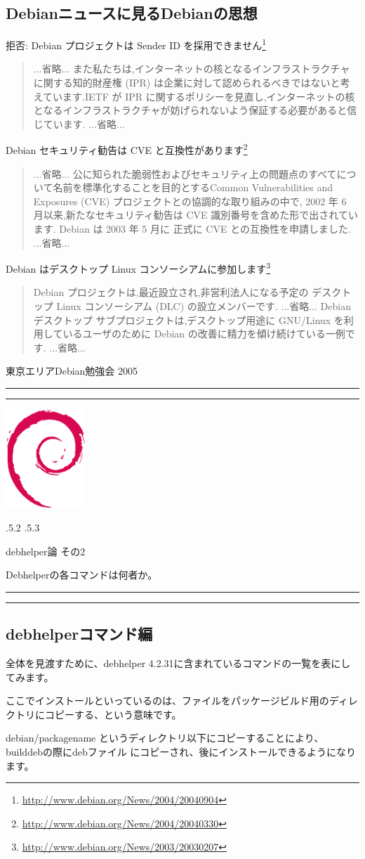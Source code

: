 \documentclass[mingoth]{jsarticle}
\makeatletter
\renewcommand{\section}{\@startsection{section}{1}{\z@}%
    {\Cvs \@plus.5\Cdp \@minus.2\Cdp}%
    {.5\Cvs \@plus.3\Cdp}%
    {\normalfont\Large\headfont\raggedright\centering}} %
\newcommand{\dancersection}[2]{%
\newpage
東京エリアDebian勉強会 2005
\hrule
\vspace{0.5mm}
\hrule
\hfill{}\includegraphics[width=3cm]{image200502/openlogo-nd.eps}\\
\vspace{-4cm}
\begin{center}
  \section{#1}
\end{center}
\hfill{}#2\hspace{3cm}\space\\
\hrule
\hrule
\vspace{1cm}
}
\makeatother
\begin{document}
\subsection{Debianニュースに見るDebianの思想}
拒否: Debian プロジェクトは Sender ID を採用できません\footnote{\url{http://www.debian.org/News/2004/20040904}}
\begin{quote}
...省略...
また私たちは,インターネットの核となるインフラストラクチャに関する知的財産権 (IPR) は企業に対して認められるべきではないと考えています.IETF が IPR に関するポリシーを見直し,インターネットの核となるインフラストラクチャが妨げられないよう保証する必要があると信じています.
...省略...
\end{quote}
Debian セキュリティ勧告は CVE と互換性があります\footnote{\url{http://www.debian.org/News/2004/20040330}}
\begin{quote}
...省略...
公に知られた脆弱性およびセキュリティ上の問題点のすべてについて名前を標準化することを目的とするCommon Vulnerabilities and Exposures (CVE) プロジェクトとの協調的な取り組みの中で, 2002 年 6 月以来,新たなセキュリティ勧告は CVE 識別番号を含めた形で出されています. Debian は 2003 年 5 月に 正式に CVE との互換性を申請しました.
...省略...
\end{quote}
Debian はデスクトップ Linux コンソーシアムに参加します\footnote{\url{http://www.debian.org/News/2003/20030207}}
\begin{quote}
Debian プロジェクトは,最近設立され,非営利法人になる予定の デスクトップ Linux コンソーシアム (DLC) の設立メンバーです.
...省略...
Debian デスクトップ サブプロジェクトは,デスクトップ用途に GNU/Linux を利用しているユーザのために Debian の改善に精力を傾け続けている一例です.
...省略...
\end{quote}

\dancersection{debhelper論 その2}{Debhelperの各コマンドは何者か。}

\subsection{debhelperコマンド編}


全体を見渡すために、debhelper 4.2.31に含まれているコマンドの一覧を表にしてみます。

ここでインストールといっているのは、ファイルをパッケージビルド用のディレ
クトリにコピーする、という意味です。

debian/packagename 
というディレクトリ以下にコピーすることにより、builddebの際にdebファイル
にコピーされ、後にインストールできるようになります。
\end{document}
